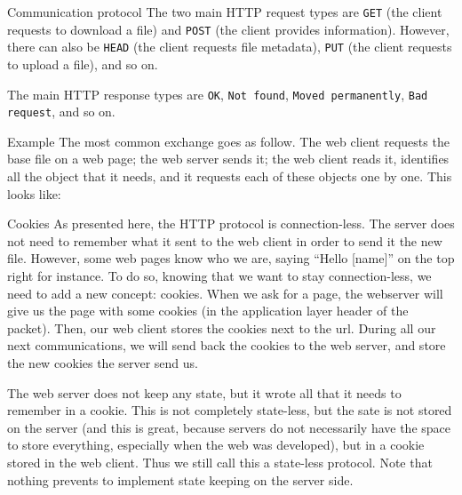 \documentclass[a4paper]{article}
\begin{document}
\begin{parag}{Communication protocol}
    The two main HTTP request types are \texttt{GET} (the client requests to download a file) and \texttt{POST} (the client provides information). However, there can also be \texttt{HEAD} (the client requests file metadata), \texttt{PUT} (the client requests to upload a file), and so on.

    The main HTTP response types are \texttt{OK}, \texttt{Not found}, \texttt{Moved permanently}, \texttt{Bad request}, and so on.

    \begin{subparag}{Example}
        The most common exchange goes as follow. The web client requests the base file on a web page; the web server sends it; the web client reads it, identifies all the object that it needs, and it requests each of these objects one by one. This looks like:
    \end{subparag}

    \begin{subparag}{Cookies}
        As presented here, the HTTP protocol is connection-less. The server does not need to remember what it sent to the web client in order to send it the new file. However, some web pages know who we are, saying ``Hello [name]'' on the top right for instance. To do so, knowing that we want to stay connection-less, we need to add a new concept: cookies. When we ask for a page, the webserver will give us the page with some cookies (in the application layer header of the packet). Then, our web client stores the cookies next to the url. During all our next communications, we will send back the cookies to the web server, and store the new cookies the server send us. 

        The web server does not keep any state, but it wrote all that it needs to remember in a cookie. This is not completely state-less, but the sate is not stored on the server (and this is great, because servers do not necessarily have the space to store everything, especially when the web was developed), but in a cookie stored in the web client. Thus we still call this a state-less protocol. Note that nothing prevents to implement state keeping on the server side.

    \end{subparag}
\end{parag}
\end{document}
